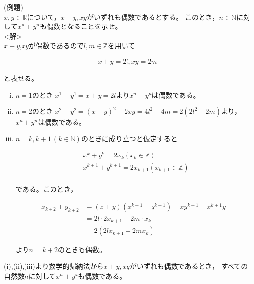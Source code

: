 \documentclass[autodetect-engine,ja=standard, 10.5pt, a4paper, titlepage]{bxjsarticle}
\begin{document}
\begin{enumerate}[1.]
\begin{enumerate}[(1)]
        \noindent(例題) \\
        $x,y\in \mathbb{R}$について，$x+y,xy$がいずれも偶数であるとする。
        このとき，$n\in \mathbb{N}$に対して$x^n+y^n$も偶数となることを示せ。\\
        <解> \\
        $x+y$,$xy$が偶数であるので$l,m\in \mathbb{Z}$を用いて
          \begin{fleqn}[20pt]
            \begin{align*}
              x+y = 2l, xy = 2m
            \end{align*}
          \end{fleqn}
        と表せる。
        \begin{enumerate}[(i)]
            \item $n=1$のとき
                  $x^1+y^1=x+y=2l$より$x^n+y^n$は偶数である。
            \item $n=2$のとき
                  $x^2+y^2=(x+y)^2-2xy=4l^2-4m=2(2l^2-2m)$より， \\
                  $x^n+y^n$は偶数である。
            \item $n=k,k+1\:(k\in \mathbb{N})$のときに成り立つと仮定すると
                    \begin{fleqn}[20pt]
                      \begin{align*}
                        &x^k + y^k = 2x_k (x_k \in \mathbb{Z})\\
                        &x^{k+1} + y^{k+1} = 2x_{k+1} (x_{k+1} \in \mathbb{Z})\\
                      \end{align*}
                    \end{fleqn}
                  である。このとき，
                    \begin{fleqn}[20pt]
                      \begin{align*}
                        x_{k+2} + y_{k+2}
                        &= (x+y)(x^{k+1} + y^{k+1}) - xy^{k+1} - x^{k+1}y \\
                        &= 2l \cdot2x_{k+1} - 2m\cdot x_k \\
                        &= 2(2lx_{k+1} - 2mx_{k})
                      \end{align*}
                    \end{fleqn}
                  より$n=k+2$のときも偶数。
        \end{enumerate}
        (i),(ii),(iii)より数学的帰納法から$x+y,xy$がいずれも偶数であるとき，
        すべての自然数$n$に対して$x^n+y^n$も偶数である。





\end{enumerate}
\end{enumerate}
\end{document}
